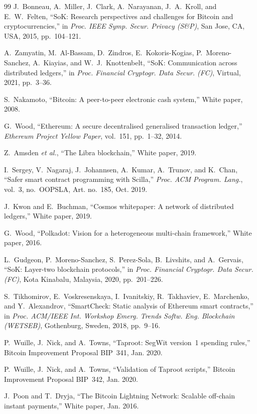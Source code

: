 \documentclass[journal]{IEEEtran}
\begin{document}
\begin{thebibliography}{99}
J.~Bonneau, A.~Miller, J.~Clark, A.~Narayanan, J.~A.~Kroll, and E.~W.~Felten, ``SoK: Research perspectives and challenges for Bitcoin and cryptocurrencies,'' in \textit{Proc. IEEE Symp. Secur. Privacy (S\&P)}, San Jose, CA, USA, 2015, pp.~104--121.

A.~Zamyatin, M.~Al-Bassam, D.~Zindros, E.~Kokoris-Kogias, P.~Moreno-Sanchez, A.~Kiayias, and W.~J.~Knottenbelt, ``SoK: Communication across distributed ledgers,'' in \textit{Proc. Financial Cryptogr. Data Secur. (FC)}, Virtual, 2021, pp.~3--36.


S.~Nakamoto, ``Bitcoin: A peer-to-peer electronic cash system,'' White paper, 2008.

G.~Wood, ``Ethereum: A secure decentralised generalised transaction ledger,'' \textit{Ethereum Project Yellow Paper}, vol.~151, pp.~1--32, 2014.

Z.~Amsden \textit{et al.}, ``The Libra blockchain,'' White paper, 2019.

I.~Sergey, V.~Nagaraj, J.~Johannsen, A.~Kumar, A.~Trunov, and K.~Chan, ``Safer smart contract programming with Scilla,'' \textit{Proc. ACM Program. Lang.}, vol.~3, no.~OOPSLA, Art. no.~185, Oct. 2019.

J.~Kwon and E.~Buchman, ``Cosmos whitepaper: A network of distributed ledgers,'' White paper, 2019.

G.~Wood, ``Polkadot: Vision for a heterogeneous multi-chain framework,'' White paper, 2016.

L.~Gudgeon, P.~Moreno-Sanchez, S.~Perez-Sola, B.~Livshits, and A.~Gervais, ``SoK: Layer-two blockchain protocols,'' in \textit{Proc. Financial Cryptogr. Data Secur. (FC)}, Kota Kinabalu, Malaysia, 2020, pp.~201--226.

S.~Tikhomirov, E.~Voskresenskaya, I.~Ivanitskiy, R.~Takhaviev, E.~Marchenko, and Y.~Alexandrov, ``SmartCheck: Static analysis of Ethereum smart contracts,'' in \textit{Proc. ACM/IEEE Int. Workshop Emerg. Trends Softw. Eng. Blockchain (WETSEB)}, Gothenburg, Sweden, 2018, pp.~9--16.

P.~Wuille, J.~Nick, and A.~Towns, ``Taproot: SegWit version~1 spending rules,'' Bitcoin Improvement Proposal BIP~341, Jan. 2020.

P.~Wuille, J.~Nick, and A.~Towns, ``Validation of Taproot scripts,'' Bitcoin Improvement Proposal BIP~342, Jan. 2020.

J.~Poon and T.~Dryja, ``The Bitcoin Lightning Network: Scalable off-chain instant payments,'' White paper, Jan. 2016.

\end{thebibliography}
\end{document}
